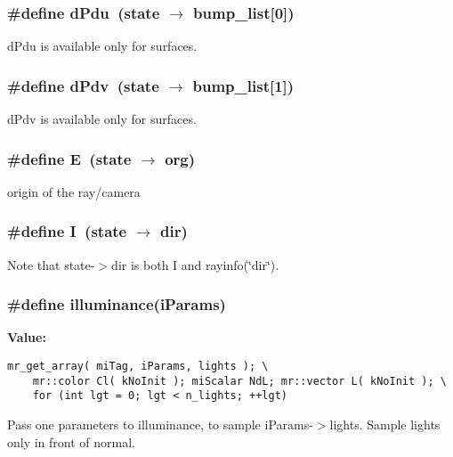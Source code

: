 \subsubsection{\setlength{\rightskip}{0pt plus 5cm}\#define d\-Pdu\ (state $\rightarrow$ bump\_\-list[0])}\label{mrRman__macros_8h_a7}


d\-Pdu is available only for surfaces. 

\subsubsection{\setlength{\rightskip}{0pt plus 5cm}\#define d\-Pdv\ (state $\rightarrow$ bump\_\-list[1])}\label{mrRman__macros_8h_a8}


d\-Pdv is available only for surfaces. 

\subsubsection{\setlength{\rightskip}{0pt plus 5cm}\#define E\ (state $\rightarrow$ org)}\label{mrRman__macros_8h_a2}


origin of the ray/camera 

\subsubsection{\setlength{\rightskip}{0pt plus 5cm}\#define I\ (state $\rightarrow$ dir)}\label{mrRman__macros_8h_a6}


Note that state-$>$dir is both I and rayinfo(\char`\"{}dir\char`\"{}). 

\subsubsection{\setlength{\rightskip}{0pt plus 5cm}\#define illuminance(i\-Params)}\label{mrRman__macros_8h_a16}


{\bf Value:}

\footnotesize\begin{verbatim}mr_get_array( miTag, iParams, lights ); \
    mr::color Cl( kNoInit ); miScalar NdL; mr::vector L( kNoInit ); \
    for (int lgt = 0; lgt < n_lights; ++lgt)
\end{verbatim}\normalsize 
Pass one parameters to illuminance, to sample i\-Params-$>$lights. Sample lights only in front of normal. 
